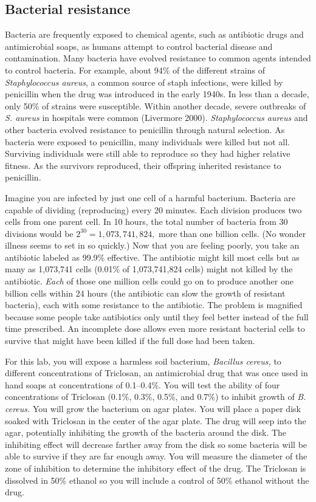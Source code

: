 \documentclass[12pt]{exam}
\begin{document}
\subsection*{Bacterial resistance}

Bacteria are frequently exposed to chemical agents, such as antibiotic drugs and antimicrobial soaps, as humans attempt to control bacterial disease and contamination. Many bacteria have evolved resistance to common agents intended to control bacteria. For example, about 94\% of the different strains of \textit{Staphylococcus aureus}, a common source of staph infections, were killed by penicillin when the drug was introduced in the early 1940s. In less than a decade, only 50\% of strains were susceptible. Within another decade, severe outbreaks of \textit{S. aureus} in hospitals were common (Livermore 2000). \textit{Staphylococcus aureus} and other bacteria evolved resistance to penicillin through natural selection. As bacteria were exposed to penicillin, many individuals were killed but not all. Surviving individuals were still able to reproduce so they had higher relative fitness. As the survivors reproduced, their offspring inherited resistance to penicillin. 

Imagine you are infected by just one cell of a harmful bacterium. Bacteria are capable of dividing (reproducing) every 20 minutes. Each division produces two cells from one parent cell. In 10 hours, the total number of bacteria from 30 divisions would be $2^{30} = 1,073,741,824,$ more than one billion cells. (No wonder illness seems to set in so quickly.) Now that you are feeling poorly, you take an antibiotic labeled as 99.9\% effective. The antibiotic might kill most cells but as many as 1,073,741 cells (0.01\% of 1,073,741,824 cells) might not killed by the antibiotic. \emph{Each} of those one million cells could go on to produce another one billion cells within 24 hours (the antibiotic can slow the growth of resistant bacteria), each with some resistance to the antibiotic. The problem is magnified because some people take antibiotics only until they feel better instead of the full time prescribed. An incomplete dose allows even more resistant bacterial cells to survive that might have been killed if the full dose had been taken. 

For this lab, you will expose a harmless soil bacterium, \textit{Bacillus cereus,} to different concentrations of Triclosan, an antimicrobial drug that was once used in hand soaps at concentrations of 0.1–0.4\%. You will test the ability of four concentrations of Triclosan (0.1\%, 0.3\%, 0.5\%, and 0.7\%) to inhibit growth of \textit{B. cereus.} You will grow the bacterium on agar plates. You will place a paper disk soaked with Triclosan in the center of the agar plate. The drug will seep into the agar, potentially inhibiting the growth of the bacteria around the disk. The inhibiting effect will decrease farther away from the disk so some bacteria will be able to survive if they are far enough away. You will measure the diameter of the zone of inhibition to determine the inhibitory effect of the drug. The Triclosan is dissolved in 50\% ethanol so you will include a control of 50\% ethanol without the drug.
\end{document}
